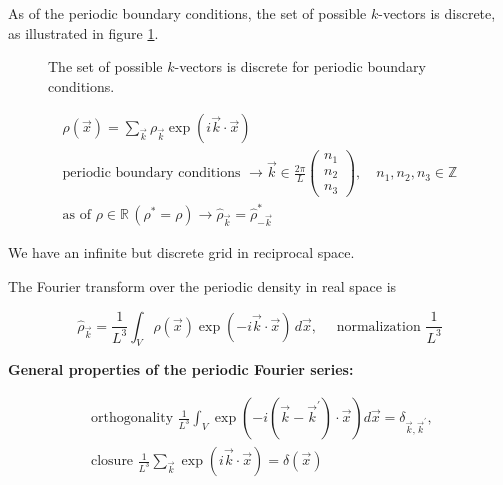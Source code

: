 As of the periodic boundary conditions, the set of possible $k$-vectors is discrete, as illustrated in figure \ref{fig:periodic_poundaries}.

\begin{figure}[ht]
    \centering
    
    \caption{The set of possible $k$-vectors is discrete for periodic boundary conditions.}
    \label{fig:periodic_poundaries}
\end{figure}

\begin{equation}
    \begin{gathered}
        \rho(\vec{x})=\sum_{\vec{k}} \rho_{\vec{k}} \exp (i \vec{k} \cdot \vec{x}) \\
        \text{periodic boundary conditions } \rightarrow \vec{k} \in \frac{2 \pi}{L}\left(\begin{array}{l}n_1 \\ n_2 \\ n_3\end{array}\right), \quad n_1, n_2, n_3 \in \mathbb{Z} \\
        \text{as of } \rho \in \mathbb{R} \, (\rho^* = \rho) \rightarrow \hat{\rho}_{\vec{k}}=\hat{\rho}_{-\vec{k}}^{*}
    \end{gathered}
\end{equation}

We have an infinite but discrete grid in reciprocal space.

The Fourier transform over the periodic density in real space is

\begin{equation}
    \label{eq:fourier_rho}
    \hat{\rho}_{\vec{k}}=\frac{1}{L^3} \int_V \rho(\vec{x}) \exp (-i \vec{k} \cdot \vec{x}) \, d \vec{x}, \quad \text { normalization } \frac{1}{L^3}
\end{equation}

\textcolor{blue1}{\textbf{General properties of the periodic Fourier series:}}

\begin{equation}
    \begin{gathered}
    \text { orthogonality } \frac{1}{L^3} \int_V \exp \left(-i\left(\vec{k}-\vec{k}^{\prime}\right) \cdot \vec{x}\right) d \vec{x}=\delta_{\vec{k}, \vec{k}^{\prime}}, \\
    \text { closure } \frac{1}{L^3} \sum_{\vec{k}} \exp (i \vec{k} \cdot \vec{x})=\delta(\vec{x})
    \end{gathered}
\end{equation}

